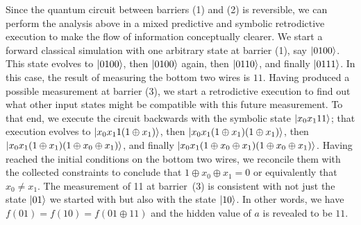 \documentclass{article}
\begin{document}
\begin{refsection}
Since the quantum circuit between barriers (1) and (2) is reversible,
we can perform the analysis above in a mixed predictive and symbolic
retrodictive execution to make the flow of information conceptually
clearer. We start a forward classical simulation with one arbitrary
state at barrier (1), say $\ket{0100}$.  This state evolves to
$\ket{0100}$, then $\ket{0100}$ again, then $\ket{0110}$, and finally
$\ket{0111}$. In this case, the result of measuring the bottom two
wires is $11$. Having produced a possible measurement at barrier (3),
we start a retrodictive execution to find out what other input states
might be compatible with this future measurement. To that end, we
execute the circuit backwards with the symbolic state
$\ket{x_0x_111}$; that execution evolves to $\ket{x_0x_11(1\oplus
  x_1)}$, then $\ket{x_0x_1(1\oplus x_1)(1\oplus x_1)}$, then
$\ket{x_0x_1(1\oplus x_1)(1\oplus x_0 \oplus x_1)}$, and finally
$\ket{x_0x_1(1\oplus x_0 \oplus x_1)(1\oplus x_0 \oplus x_1)}$. Having
reached the initial conditions on the bottom two wires, we reconcile
them with the collected constraints to conclude that $1 \oplus x_0
\oplus x_1 = 0$ or equivalently that $x_0 \neq x_1$. The measurement
of 11 at barrier~(3) is consistent with not just the state $\ket{01}$
we started with but also with the state $\ket{10}$. In other words, we
have $f(01) = f(10) = f(01 \oplus 11)$ and the hidden value of $a$ is
revealed to be $11$.


\end{refsection}
\end{document}
